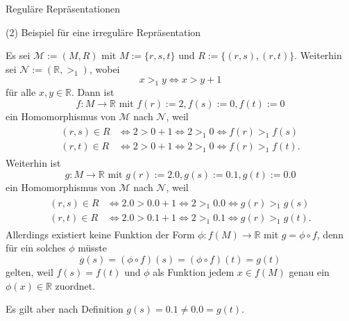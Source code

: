 \documentclass[
  8pt,
  ignorenonframetext,
]{beamer}
\begin{document}
\begin{frame}{Reguläre Repräsentationen}
\protect\hypertarget{reguluxe4re-repruxe4sentationen-4}{}
\small
\vspace{1mm}

\noindent (2) Beispiel für eine irreguläre Repräsentation \footnotesize

Es sei \(\mathcal{M} := (M,R)\) mit \(M := \{r,s,t\}\) und
\(R := \{(r,s),(r,t)\}\). Weiterhin sei
\(\mathcal{N} := (\mathbb{R},>_{1})\), wobei \begin{equation}
x >_{1} y \Leftrightarrow x > y + 1
\end{equation} für alle \(x,y\in \mathbb{R}\). Dann ist \begin{equation}
f : M \to \mathbb{R} \mbox{ mit } f(r) := 2, f(s) := 0, f(t) := 0
\end{equation} ein Homomorphismus von \(\mathcal{M}\) nach
\(\mathcal{N}\), weil \begin{align}
\begin{split}
(r,s) \in R & \Leftrightarrow 2 > 0 + 1 \Leftrightarrow 2 >_1 0 \Leftrightarrow f(r) >_{1} f(s) \\
(r,t) \in R & \Leftrightarrow 2 > 0 + 1 \Leftrightarrow 2 >_1 0 \Leftrightarrow f(r) >_{1} f(t).
\end{split}
\end{align} Weiterhin ist \begin{equation}
g : M \to \mathbb{R} \mbox{ mit } g(r) := 2.0, g(s) := 0.1, g(t) := 0.0
\end{equation} ein Homomorphismus von \(\mathcal{M}\) nach
\(\mathcal{N}\), weil \begin{align}
\begin{split}
(r,s) \in R & \Leftrightarrow 2.0 > 0.0 + 1 \Leftrightarrow 2 >_1 0.0 \Leftrightarrow g(r) >_{1} g(s) \\
(r,t) \in R & \Leftrightarrow 2.0 > 0.1 + 1 \Leftrightarrow 2 >_1 0.1 \Leftrightarrow g(r) >_{1} g(t).
\end{split}
\end{align} Allerdings existiert keine Funktion der Form
\(\phi:f(M) \to \mathbb{R}\) mit \(g = \phi \circ f\), denn für ein
solches \(\phi\) müsste \begin{equation}
g(s) = (\phi \circ f)(s) = (\phi \circ f)(t) = g(t)
\end{equation} gelten, weil \(f(s) = f(t)\) und \(\phi\) als Funktion
jedem \(x \in f(M)\) genau ein \(\phi(x) \in \mathbb{R}\) zuordnet.

Es gilt aber nach Definition \(g(s) = 0.1 \neq 0.0 = g(t)\).
\end{frame}
\end{document}
